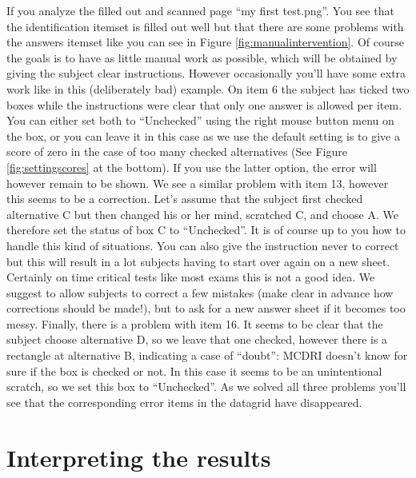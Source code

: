 \documentclass[10pt,a4paper]{article}
\newcommand{\name}{MCDRI }
\begin{document}
If you analyze the filled out and scanned page ``my first test.png''. You see that the identification itemset is filled out well but that there are some problems with the answers itemset like you can see in Figure \ref{fig:manualintervention}. Of course the goals is to have as little manual work as possible, which will be obtained by giving the subject clear instructions. However occasionally you'll have some extra work like in this (deliberately bad) example. On item 6 the subject has ticked two boxes while the instructions were clear that only one answer is allowed per item. You can either set both to ``Unchecked'' using the right mouse button menu on the box, or you can leave it in this case as we use the default setting is to give a score of zero in the case of too many checked alternatives (See Figure \ref{fig:settingscores} at the bottom). If you use the latter option, the error will however remain to be shown. We see a similar problem with item 13, however this seems to be a correction. Let's assume that the subject first checked alternative C but then changed his or her mind, scratched C, and choose A. We therefore set the status of box C to ``Unchecked''. It is of course up to you how to handle this kind of situations. You can also give the instruction never to correct but this will result in a lot subjects having to start over again on a new sheet. Certainly on time critical tests like most exams this is not a good idea. We suggest to allow subjects to correct a few mistakes (make clear in advance how corrections should be made!), but to ask for a new answer sheet if it becomes too messy. Finally, there is a problem with item 16. It seems to be clear that the subject choose alternative D, so we leave that one checked, however there is a rectangle at alternative B, indicating a case of ``doubt'': \name doesn't know for sure if the box is checked or not. In this case it seems to be an unintentional scratch, so we set this box to ``Unchecked''. As we solved all three problems you'll see that the corresponding error items in the datagrid have disappeared. 


\section{Interpreting the results}
\end{document}
